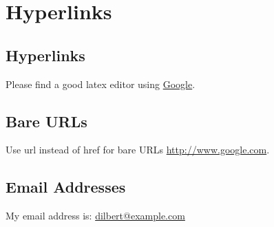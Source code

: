 \documentclass{article}
\begin{document}
\section{Hyperlinks}

\subsection{Hyperlinks}

Please find a good latex editor using \href{http://www.google.com}{Google}.

\subsection{Bare URLs}

Use url instead of href for bare URLs \url{http://www.google.com}.

\subsection{Email Addresses}

My email address is: \href{mailto:dilbert@example.com}{dilbert@example.com}
\end{document}
